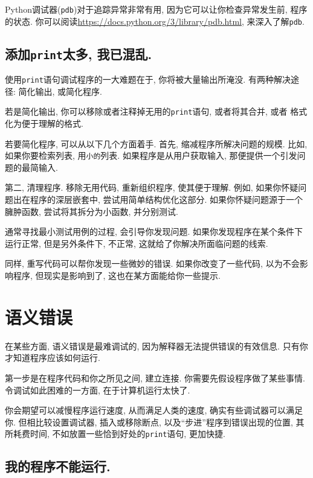 \documentclass[10pt]{book}
\begin{document}
Python调试器({\tt pdb})对于追踪异常非常有用, 
因为它可以让你检查异常发生前, 程序的状态. 
你可以阅读\url{https://docs.python.org/3/library/pdb.html}, 来深入了解{\tt pdb}.


\subsection{添加{\tt print}太多, 我已混乱.}

使用{\tt print}语句调试程序的一大难题在于, 你将被大量输出所淹没. 
有两种解决途径: 简化输出, 或简化程序. 

若是简化输出, 你可以移除或者注释掉无用的{\tt print}语句, 或者将其合并, 或者
格式化为便于理解的格式. 

若要简化程序, 可以从以下几个方面着手. 
首先, 缩减程序所解决问题的规模. 
比如, 如果你要检索列表, 用{\tt 小的}列表. 
如果程序是从用户获取输入, 那便提供一个引发问题的最简输入. 

第二, 清理程序. 移除无用代码, 重新组织程序, 使其便于理解. 
例如, 如果你怀疑问题出在程序的深层嵌套中, 
尝试用简单结构优化这部分. 
如果你怀疑问题源于一个臃肿函数, 尝试将其拆分为小函数, 并分别测试. 

通常寻找最小测试用例的过程, 会引导你发现问题. 
如果你发现程序在某个条件下运行正常, 但是另外条件下, 不正常, 
这就给了你解决所面临问题的线索. 

同样, 重写代码可以帮你发现一些微妙的错误. 
如果你改变了一些代码, 以为不会影响程序, 但现实是影响到了, 
这也在某方面能给你一些提示. 


\section{语义错误}

在某些方面, 语义错误是最难调试的, 
因为解释器无法提供错误的有效信息. 
只有你才知道程序应该如何运行. 

第一步是在程序代码和你之所见之间, 建立连接. 
你需要先假设程序做了某些事情. 
令调试如此困难的一方面, 在于计算机运行太快了. 

你会期望可以减慢程序运行速度, 从而满足人类的速度, 
确实有些调试器可以满足你. 
但相比较设置调试器, 插入或移除断点, 以及``步进''程序到错误出现的位置, 其所耗费时间, 
不如放置一些恰到好处的{\tt print}语句, 更加快捷. 

\subsection{我的程序不能运行.}
\end{document}
